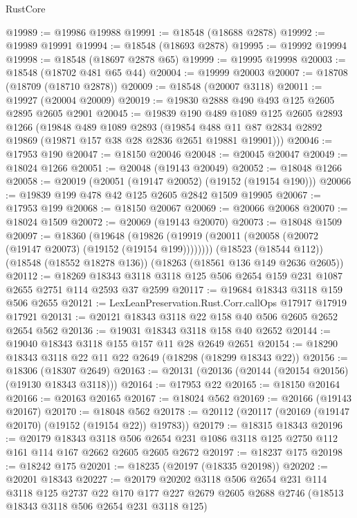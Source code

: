 \begin{lexlean}{RustCore}
\begin{coremodule}
@19989 := @19986 @19988
@19991 := @18548 (@18688 @2878)
@19992 := @19989 @19991
@19994 := @18548 (@18693 @2878)
@19995 := @19992 @19994
@19998 := @18548 (@18697 @2878 @65)
@19999 := @19995 @19998
@20003 := @18548 (@18702 @481 @65 @44)
@20004 := @19999 @20003
@20007 := @18708 (@18709 (@18710 @2878))
@20009 := @18548 (@20007 @3118)
@20011 := @19927 (@20004 @20009)
@20019 := @19830 @2888 @490 @493 @125 @2605 @2895 @2605 @2901
@20045 := @19839
    @190
    @489
    @1089
    @125
    @2605
    @2893
    @1266
    (@19848
      @489
      @1089
      @2893
      (@19854 @488 @11 @87 @2834 @2892 @19869 (@19871 @157 @38 @28 @2836 @2651 @19881 @19901)))
@20046 := @17953 @190
@20047 := @18150 @20046
@20048 := @20045 @20047
@20049 := @18024 @1266
@20051 := @20048 (@19143 @20049)
@20052 := @18048 @1266
@20058 := @20019 (@20051 (@19147 @20052) (@19152 (@19154 @190)))
@20066 := @19839 @199 @478 @42 @125 @2605 @2842 @1509 @19905
@20067 := @17953 @199
@20068 := @18150 @20067
@20069 := @20066 @20068
@20070 := @18024 @1509
@20072 := @20069 (@19143 @20070)
@20073 := @18048 @1509
@20097 := @18360
    (@19648 (@19826 (@19919 (@20011 (@20058 (@20072 (@19147 @20073) (@19152 (@19154 @199))))))))
    (@18523 (@18544 @112))
    (@18548 (@18552 @18278 @136))
    (@18263 (@18561 @136 @149 @2636 @2605))
@20112 := @18269 @18343 @3118 @3118 @125 @506 @2654 @159 @231 @1087 @2655 @2751 @114 @2593 @37 @2599
@20117 := @19684 @18343 @3118 @159 @506 @2655
@20121 := LexLeanPreservation.Rust.Corr.callOps @17917 @17919 @17921
@20131 := @20121 @18343 @3118 @22 @158 @40 @506 @2605 @2652 @2654 @562
@20136 := @19031 @18343 @3118 @158 @40 @2652
@20144 := @19040 @18343 @3118 @155 @157 @11 @28 @2649 @2651
@20154 := @18290 @18343 @3118 @22 @11 @22 @2649 (@18298 (@18299 @18343 @22))
@20156 := @18306 (@18307 @2649)
@20163 := @20131 (@20136 (@20144 (@20154 @20156) (@19130 @18343 @3118)))
@20164 := @17953 @22
@20165 := @18150 @20164
@20166 := @20163 @20165
@20167 := @18024 @562
@20169 := @20166 (@19143 @20167)
@20170 := @18048 @562
@20178 := @20112 (@20117 (@20169 (@19147 @20170) (@19152 (@19154 @22)) @19783))
@20179 := @18315 @18343
@20196 := @20179
    @18343
    @3118
    @506
    @2654
    @231
    @1086
    @3118
    @125
    @2750
    @112
    @161
    @114
    @167
    @2662
    @2605
    @2605
    @2672
@20197 := @18237 @175
@20198 := @18242 @175
@20201 := @18235 (@20197 (@18335 @20198))
@20202 := @20201 @18343
@20227 := @20179
    @20202
    @3118
    @506
    @2654
    @231
    @114
    @3118
    @125
    @2737
    @22
    @170
    @177
    @227
    @2679
    @2605
    @2688
    @2746
    (@18513 @18343 @3118 @506 @2654 @231 @3118 @125)

\end{coremodule}
\end{lexlean}
